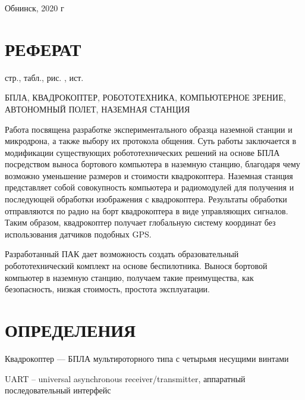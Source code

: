 \documentclass[a4paper,12pt]{article}
\newcounter{mycitecount}                                %
\begin{document}
\vfill
\large

\begin{center}
Обнинск, 2020 г
\end{center}

\onehalfspacing

\pagebreak

\thispagestyle{empty}

\section*{\centering РЕФЕРАТ}
 стр.,  табл.,  рис. , \totalmycitecounts ист. 

БПЛА, КВАДРОКОПТЕР, РОБОТОТЕХНИКА, КОМПЬЮТЕРНОЕ ЗРЕНИЕ, АВТОНОМНЫЙ ПОЛЕТ, НАЗЕМНАЯ СТАНЦИЯ

Работа посвящена разработке экспериментального образца наземной станции и микродрона, а также выбору их протокола общения.
Суть работы заключается в модификации существующих робототехнических решений на основе БПЛА посредством выноса бортового компьютера в наземную станцию, благодаря чему возможно уменьшение размеров и стоимости квадрокоптера.
Наземная станция представляет собой совокупность компьютера и радиомодулей для получения и последующей обработки изображения с квадрокоптера. Результаты обработки отправляются по радио на борт квадрокоптера в виде управляющих сигналов.
Таким образом, квадрокоптер получает глобальную систему координат без использования датчиков подобных GPS.

Разработанный ПАК дает возможность создать образовательный робототехнический комплект на основе беспилотника. Вынося бортовой компьютер в наземную станцию, получаем такие преимущества, как безопасность, низкая стоимость, простота эксплуатации.

\pagebreak
\thispagestyle{empty}

\section*{\centering ОПРЕДЕЛЕНИЯ}

Квадрокоптер --- БПЛА мультироторного типа с четырьмя несущими винтами

UART -- universal asynchronous receiver/transmitter, аппаратный последовательный интерфейс
\end{document}

